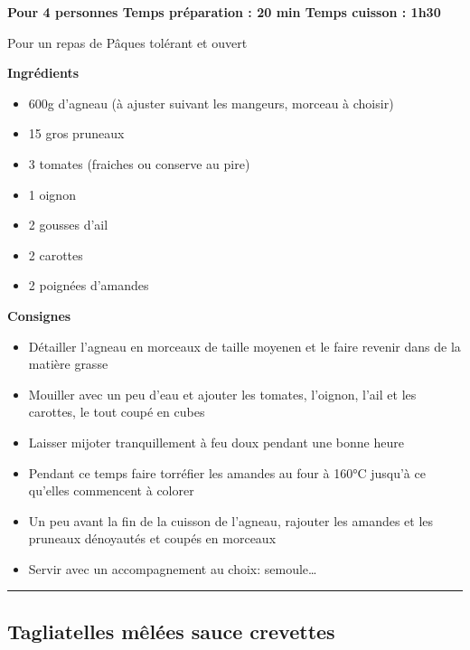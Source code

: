 \documentclass[]{book}
\providecommand{\tightlist}{%
  \setlength{\itemsep}{0pt}\setlength{\parskip}{0pt}}
\begin{document}
\begin{salebox}
\textbf{Pour 4 personnes \textbar{} Temps préparation : 20 min
\textbar{} Temps cuisson : 1h30}

Pour un repas de Pâques tolérant et ouvert
\end{salebox}

 \textbf{Ingrédients}

\begin{itemize}
\tightlist
\item
  600g d'agneau (à ajuster suivant les mangeurs, morceau à choisir)
\item
  15 gros pruneaux
\item
  3 tomates (fraiches ou conserve au pire)
\item
  1 oignon
\item
  2 gousses d'ail
\item
  2 carottes
\item
  2 poignées d'amandes
\end{itemize}

\textbf{Consignes}

\begin{itemize}
\tightlist
\item
  Détailler l'agneau en morceaux de taille moyenen et le faire revenir
  dans de la matière grasse
\item
  Mouiller avec un peu d'eau et ajouter les tomates, l'oignon, l'ail et
  les carottes, le tout coupé en cubes
\item
  Laisser mijoter tranquillement à feu doux pendant une bonne heure
\item
  Pendant ce temps faire torréfier les amandes au four à 160°C jusqu'à
  ce qu'elles commencent à colorer
\item
  Un peu avant la fin de la cuisson de l'agneau, rajouter les amandes et
  les pruneaux dénoyautés et coupés en morceaux
\item
  Servir avec un accompagnement au choix: semoule\ldots{}
\end{itemize}

\begin{center}\rule{0.5\linewidth}{0.5pt}\end{center}

\subsection*{\texorpdfstring{{Tagliatelles mêlées sauce
crevettes}}{Tagliatelles mêlées sauce crevettes}}\label{tagliatelles-muxealuxe9es-sauce-crevettes}
\end{document}
